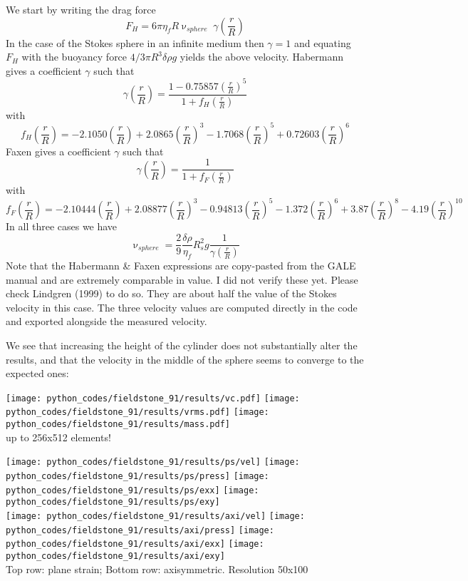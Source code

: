 We start by writing the drag force
\[
F_H = 6 \pi \eta_f R \upnu_{sphere}\;  \gamma\left(\frac{r}{R}\right) 
\]
In the case of the Stokes sphere in an infinite medium then $\gamma =1$ and equating
$F_H$ with the buoyancy force $4/3 \pi R^3 \delta\rho g$ yields the above velocity.
Habermann gives a coefficient $\gamma$ such that 
\[
\gamma\left(\frac{r}{R}\right)  = \frac{1-0.75857 \left(\frac{r}{R}\right)^5}{1+f_H\left(\frac{r}{R}\right)}
\]
with 
\[
f_H\left(\frac{r}{R}\right) = -2.1050\left(\frac{r}{R}\right)+ 2.0865\left(\frac{r}{R}\right)^3
- 1.7068\left(\frac{r}{R}\right)^5 + 0.72603\left(\frac{r}{R}\right)^6 
\]
Faxen gives a coefficient $\gamma$ such that 
\[
\gamma\left(\frac{r}{R}\right) = \frac{1}{1 + f_F\left(\frac{r}{R}\right)} 
\]
with 
\[
f_F\left(\frac{r}{R}\right) 
= -2.10444(\frac{r}{R}) 
+ 2.08877(\frac{r}{R})^3 
- 0.94813(\frac{r}{R})^5 
- 1.372(\frac{r}{R})^6 
+ 3.87(\frac{r}{R})^8 
- 4.19(\frac{r}{R})^{10}
\]
In all three cases we have 
\[
\upnu_{sphere} = \frac{2}{9} \frac{\delta \rho}{\eta_f} R_s^2 g \frac{1}{\gamma(\frac{r}{R})}
\]
Note that the Habermann \& Faxen expressions are copy-pasted from the GALE manual and 
are extremely comparable in value. I did not verify these yet. 
Please check Lindgren (1999) \cite{lind99} to do so. They are about half the value of the Stokes velocity
in this case. The three velocity values are computed directly in the code and exported alongside
the measured velocity.

We see that increasing the height of the cylinder does not substantially alter the results, and that 
the velocity in the middle of the sphere seems to converge to the expected ones:
\begin{center}
\texttt{[image: python\_codes/fieldstone\_91/results/vc.pdf]}
\texttt{[image: python\_codes/fieldstone\_91/results/vrms.pdf]}
\texttt{[image: python\_codes/fieldstone\_91/results/mass.pdf]}\\
{\captionfont up to 256x512 elements!}
\end{center}


\begin{center}
\texttt{[image: python\_codes/fieldstone\_91/results/ps/vel]}
\texttt{[image: python\_codes/fieldstone\_91/results/ps/press]}
\texttt{[image: python\_codes/fieldstone\_91/results/ps/exx]}
\texttt{[image: python\_codes/fieldstone\_91/results/ps/exy]}\\
\texttt{[image: python\_codes/fieldstone\_91/results/axi/vel]}
\texttt{[image: python\_codes/fieldstone\_91/results/axi/press]}
\texttt{[image: python\_codes/fieldstone\_91/results/axi/exx]}
\texttt{[image: python\_codes/fieldstone\_91/results/axi/exy]}\\
{\captionfont Top row: plane strain; Bottom row: axisymmetric. Resolution 50x100}
\end{center}


